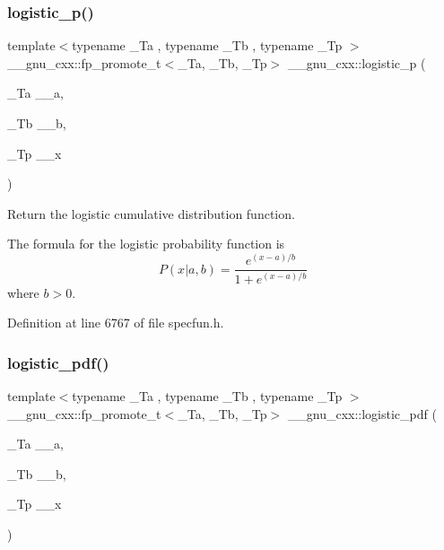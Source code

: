 \subsubsection{\texorpdfstring{logistic\+\_\+p()}{logistic\_p()}}
{\footnotesize\ttfamily template$<$typename \+\_\+\+Ta , typename \+\_\+\+Tb , typename \+\_\+\+Tp $>$ \\
\+\_\+\+\_\+gnu\+\_\+cxx\+::fp\+\_\+promote\+\_\+t$<$\+\_\+\+Ta, \+\_\+\+Tb, \+\_\+\+Tp$>$ \+\_\+\+\_\+gnu\+\_\+cxx\+::logistic\+\_\+p (\begin{DoxyParamCaption}\item[{\+\_\+\+Ta}]{\+\_\+\+\_\+a,  }\item[{\+\_\+\+Tb}]{\+\_\+\+\_\+b,  }\item[{\+\_\+\+Tp}]{\+\_\+\+\_\+x }\end{DoxyParamCaption})\hspace{0.3cm}{\ttfamily [inline]}}



Return the logistic cumulative distribution function. 

The formula for the logistic probability function is \[ P(x| a, b) = \frac{e^{(x - a)/b}}{1 + e^{(x - a)/b}} \] where $b > 0$. 

Definition at line 6767 of file specfun.\+h.

\mbox{\label{group__gnu__math__spec__func_gaeb3e768c11c8cd11804827a09f19b1e3}} 
\subsubsection{\texorpdfstring{logistic\+\_\+pdf()}{logistic\_pdf()}}
{\footnotesize\ttfamily template$<$typename \+\_\+\+Ta , typename \+\_\+\+Tb , typename \+\_\+\+Tp $>$ \\
\+\_\+\+\_\+gnu\+\_\+cxx\+::fp\+\_\+promote\+\_\+t$<$\+\_\+\+Ta, \+\_\+\+Tb, \+\_\+\+Tp$>$ \+\_\+\+\_\+gnu\+\_\+cxx\+::logistic\+\_\+pdf (\begin{DoxyParamCaption}\item[{\+\_\+\+Ta}]{\+\_\+\+\_\+a,  }\item[{\+\_\+\+Tb}]{\+\_\+\+\_\+b,  }\item[{\+\_\+\+Tp}]{\+\_\+\+\_\+x }\end{DoxyParamCaption})\hspace{0.3cm}{\ttfamily [inline]}}



